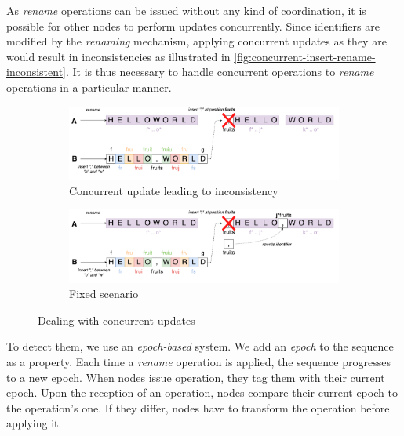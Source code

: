 \documentclass[sigplan,10pt]{acmart}
\begin{document}
\label{sec:dealing-with-concurrent-updates}

As \emph{rename} operations can be issued without any kind of coordination, it is possible for other nodes to perform updates concurrently.
Since identifiers are modified by the \emph{renaming} mechanism, applying concurrent updates as they are would result in inconsistencies as illustrated in \autoref{fig:concurrent-insert-rename-inconsistent}.
It is thus necessary to handle concurrent operations to \emph{rename} operations in a particular manner.

\begin{figure}
    \centering
    \begin{subfigure}{0.45\textwidth}
        \includegraphics[width=1\textwidth]{img/concurrent-insert-rename-inconsistent.png}
        \caption{Concurrent update leading to inconsistency}
        \label{fig:concurrent-insert-rename-inconsistent}
    \end{subfigure}
    \begin{subfigure}{0.45\textwidth}
        \includegraphics[width=1\textwidth]{img/concurrent-insert-rename-fixed.png}
        \caption{Fixed scenario}
        \label{fig:concurrent-insert-rename-fixed}
    \end{subfigure}
    \caption{Dealing with concurrent updates}
    \label{fig:concurrent-insert-rename}
\end{figure}

To detect them, we use an \emph{epoch-based} system.
We add an \emph{epoch} to the sequence as a property.
Each time a \emph{rename} operation is applied, the sequence progresses to a new epoch.
When nodes issue operation, they tag them with their current epoch.
Upon the reception of an operation, nodes compare their current epoch to the operation's one.
If they differ, nodes have to transform the operation before applying it.
\end{document}

